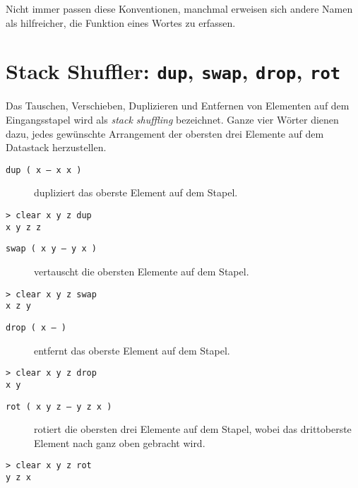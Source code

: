 Nicht immer passen diese Konventionen, manchmal erweisen sich andere Namen als hilfreicher, die Funktion eines Wortes zu erfassen.

\section{Stack Shuffler: \texttt{dup}, \texttt{swap}, \texttt{drop}, \texttt{rot}}

Das Tauschen, Verschieben, Duplizieren und Entfernen von Elementen auf dem Eingangsstapel wird als \emph{stack shuffling} bezeichnet. Ganze vier Wörter dienen dazu, jedes gewünschte Arrangement der obersten drei Elemente auf dem Datastack herzustellen.

\begin{description}
\item[\texttt{dup ( x -- x x )}] dupliziert das oberste Element auf dem Stapel.
\end{description}

\begin{verbatim}
> clear x y z dup
x y z z
\end{verbatim}

\begin{description}
\item[\texttt{swap ( x y -- y x )}] vertauscht die obersten Elemente auf dem Stapel.
\end{description}

\begin{verbatim}
> clear x y z swap
x z y
\end{verbatim}

\begin{description}
\item[\texttt{drop ( x -- )}] entfernt das oberste Element auf dem Stapel.
\end{description}

\begin{verbatim}
> clear x y z drop
x y
\end{verbatim}

\begin{description}
\item[\texttt{rot ( x y z -- y z x )}] rotiert die obersten drei Elemente auf dem Stapel, wobei das dritt\-oberste Element nach ganz oben gebracht wird.
\end{description}

\begin{verbatim}
> clear x y z rot
y z x
\end{verbatim}


